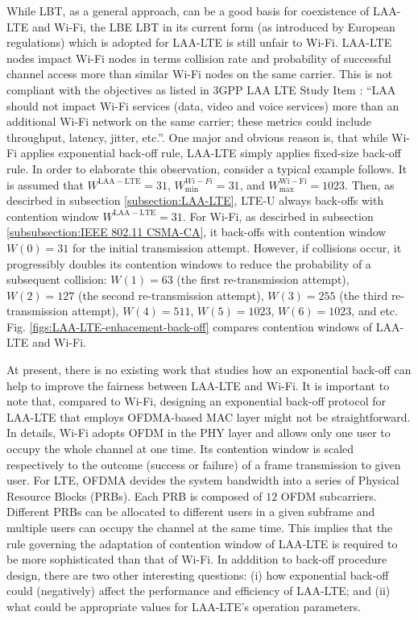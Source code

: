 While LBT, as a general approach, can be a good basis for coexistence of LAA-LTE and Wi-Fi, the LBE LBT in its current form (as introduced by European regulations) which is adopted for LAA-LTE is still unfair to Wi-Fi. LAA-LTE nodes impact Wi-Fi nodes in terms collision rate and probability of successful channel access more than similar Wi-Fi nodes on the same carrier. This is not compliant with the objectives as listed in 3GPP LAA LTE Study Item \cite{LAA-LTE-SI}: ``LAA should not impact Wi-Fi services (data, video and voice services) more than an additional Wi-Fi network on the same carrier; these metrics could include throughput, latency, jitter, etc.''. One major and obvious reason is, that while Wi-Fi applies exponential back-off rule, LAA-LTE simply applies fixed-size back-off rule. In order to elaborate this observation, consider a typical example follows. It is assumed that $W^{\mathrm{LAA-LTE}}=31$, $W^{Wi-Fi}_{\min}=31$, and $W^{\mathrm{Wi-Fi}}_{\max}=1023$. Then, as descirbed in subsection \ref{subsection:LAA-LTE}, LTE-U always back-offs with contention window $W^{\mathrm{LAA-LTE}}=31$. For Wi-Fi, as descirbed in subsection \ref{subsubsection:IEEE 802.11 CSMA-CA}, it back-offs with contention window $W(0)=31$ for the initial transmission attempt. However, if collisions occur, it progressibly doubles its contention windows to reduce the probability of a subsequent collision: $W(1)=63$ (the first re-transmission attempt), $W(2)=127$ (the second re-transmission attempt), $W(3)=255$ (the third re-transmission attempt), $W(4)=511$, $W(5)=1023$, $W(6)=1023$, and etc. Fig. \ref{figs:LAA-LTE-enhacement-back-off} compares contention windows of LAA-LTE and Wi-Fi.

At present, there is no existing work that studies how an exponential back-off can help to improve the fairness between LAA-LTE and Wi-Fi. It is important to note that, compared to Wi-Fi, designing an exponential back-off protocol for LAA-LTE that employs OFDMA-based MAC layer might not be straightforward. In details, Wi-Fi adopts OFDM in the PHY layer and allows only one user to occupy the whole channel at one time. Its contention window is scaled respectively to the outcome (success or failure) of a frame transmission to given user. For LTE, OFDMA devides the system bandwidth into a series of Physical Resource Blocks (PRBs). Each PRB is composed of $12$ OFDM subcarriers. Different PRBs can be allocated to different users in a given subframe and multiple users can occupy the channel at the same time. This implies that the rule governing the adaptation of contention window of LAA-LTE is required to be more sophisticated than that of Wi-Fi. In adddition to back-off procedure design, there are two other interesting questions: (i) how exponential back-off could (negatively) affect the performance and efficiency of LAA-LTE; and (ii) what could be appropriate values for LAA-LTE's operation parameters.

